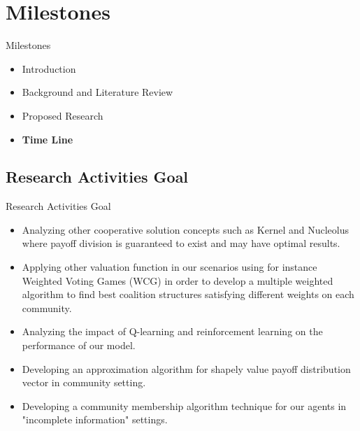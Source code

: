 \documentclass{beamer}
\begin{document}
\section{Milestones}
\begin{frame}{Milestones}
    \begin{itemize}
     	\itemsep=.5cm
    	\item Introduction
    	\item Background and Literature Review
    	\item Proposed Research
    	\item {\bf Time Line}
    \end{itemize}
\end{frame}

\subsection{Research Activities Goal}
\begin{frame}{Research Activities Goal}
    \begin{itemize}
        \item Analyzing other cooperative solution concepts such as Kernel
        and Nucleolus where payoff division is guaranteed to exist and may
        have optimal results.

        \item Applying other valuation function in our scenarios using for
        instance Weighted Voting Games (WCG) in order to develop a
        multiple weighted algorithm to find best coalition structures
        satisfying different weights on each community.

        \item Analyzing the impact of Q-learning and reinforcement
        learning on the performance of our model.

        \item Developing an approximation algorithm for shapely value
        payoff distribution vector in community setting.

        \item Developing a community membership algorithm technique for
        our agents in "incomplete information" settings.

    \end{itemize}
\end{frame}
\end{document}
